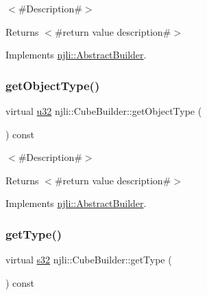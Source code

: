 $<$\#\+Description\#$>$

\begin{DoxyReturn}{Returns}
$<$\#return value description\#$>$ 
\end{DoxyReturn}


Implements \mbox{\hyperlink{classnjli_1_1_abstract_builder_a902f73ea78031b06aca183a417f3413b}{njli\+::\+Abstract\+Builder}}.

\mbox{\label{classnjli_1_1_cube_builder_abe4f6db15eb9ca1d680fc2652621d69e}} 
\subsubsection{\texorpdfstring{get\+Object\+Type()}{getObjectType()}}
{\footnotesize\ttfamily virtual \mbox{\hyperlink{_util_8h_a10e94b422ef0c20dcdec20d31a1f5049}{u32}} njli\+::\+Cube\+Builder\+::get\+Object\+Type (\begin{DoxyParamCaption}{ }\end{DoxyParamCaption}) const\hspace{0.3cm}{\ttfamily [virtual]}}

$<$\#\+Description\#$>$

\begin{DoxyReturn}{Returns}
$<$\#return value description\#$>$ 
\end{DoxyReturn}


Implements \mbox{\hyperlink{classnjli_1_1_abstract_builder_a0f2d344fcf697b167f4f2b1122b5fb33}{njli\+::\+Abstract\+Builder}}.

\mbox{\label{classnjli_1_1_cube_builder_a0c7103ba4c07559e32569f8843c31baf}} 
\subsubsection{\texorpdfstring{get\+Type()}{getType()}}
{\footnotesize\ttfamily virtual \mbox{\hyperlink{_util_8h_aa62c75d314a0d1f37f79c4b73b2292e2}{s32}} njli\+::\+Cube\+Builder\+::get\+Type (\begin{DoxyParamCaption}{ }\end{DoxyParamCaption}) const\hspace{0.3cm}{\ttfamily [virtual]}}

